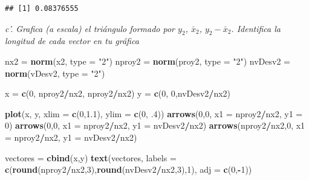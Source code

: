 \documentclass[
]{article}
\newenvironment{Shaded}{\begin{snugshade}}{\end{snugshade}}
\newcommand{\DataTypeTok}[1]{\textcolor[rgb]{0.13,0.29,0.53}{#1}}
\newcommand{\DecValTok}[1]{\textcolor[rgb]{0.00,0.00,0.81}{#1}}
\newcommand{\FloatTok}[1]{\textcolor[rgb]{0.00,0.00,0.81}{#1}}
\newcommand{\KeywordTok}[1]{\textcolor[rgb]{0.13,0.29,0.53}{\textbf{#1}}}
\newcommand{\NormalTok}[1]{#1}
\newcommand{\OperatorTok}[1]{\textcolor[rgb]{0.81,0.36,0.00}{\textbf{#1}}}
\newcommand{\StringTok}[1]{\textcolor[rgb]{0.31,0.60,0.02}{#1}}
\begin{document}
\begin{verbatim}
## [1] 0.08376555
\end{verbatim}

\emph{c'. Grafica (a escala) el triángulo formado por \(y_2\),
\(\bar{x}_2\), \(y_2-\bar{x}_2\). Identifica la longitud de cada vector
en tu gráfica}

\begin{Shaded}
\begin{Highlighting}[]
\NormalTok{  nx2 =}\StringTok{ }\KeywordTok{norm}\NormalTok{(x2, }\DataTypeTok{type =} \StringTok{"2"}\NormalTok{)}
\NormalTok{  nproy2 =}\StringTok{ }\KeywordTok{norm}\NormalTok{(proy2, }\DataTypeTok{type =} \StringTok{"2"}\NormalTok{)}
\NormalTok{  nvDesv2 =}\StringTok{ }\KeywordTok{norm}\NormalTok{(vDesv2, }\DataTypeTok{type =} \StringTok{"2"}\NormalTok{)}

  
\NormalTok{  x =}\StringTok{ }\KeywordTok{c}\NormalTok{(}\DecValTok{0}\NormalTok{, nproy2}\OperatorTok{/}\NormalTok{nx2, nproy2}\OperatorTok{/}\NormalTok{nx2)}
\NormalTok{  y =}\StringTok{ }\KeywordTok{c}\NormalTok{(}\DecValTok{0}\NormalTok{, }\DecValTok{0}\NormalTok{,nvDesv2}\OperatorTok{/}\NormalTok{nx2)}
  
  \KeywordTok{plot}\NormalTok{(x, y, }\DataTypeTok{xlim =} \KeywordTok{c}\NormalTok{(}\DecValTok{0}\NormalTok{,}\FloatTok{1.1}\NormalTok{), }\DataTypeTok{ylim =} \KeywordTok{c}\NormalTok{(}\DecValTok{0}\NormalTok{, }\FloatTok{.4}\NormalTok{))}
  \KeywordTok{arrows}\NormalTok{(}\DecValTok{0}\NormalTok{,}\DecValTok{0}\NormalTok{, }\DataTypeTok{x1 =}\NormalTok{ nproy2}\OperatorTok{/}\NormalTok{nx2, }\DataTypeTok{y1 =} \DecValTok{0}\NormalTok{)}
  \KeywordTok{arrows}\NormalTok{(}\DecValTok{0}\NormalTok{,}\DecValTok{0}\NormalTok{, }\DataTypeTok{x1 =}\NormalTok{ nproy2}\OperatorTok{/}\NormalTok{nx2, }\DataTypeTok{y1 =}\NormalTok{ nvDesv2}\OperatorTok{/}\NormalTok{nx2)}
  \KeywordTok{arrows}\NormalTok{(nproy2}\OperatorTok{/}\NormalTok{nx2,}\DecValTok{0}\NormalTok{, }\DataTypeTok{x1 =}\NormalTok{ nproy2}\OperatorTok{/}\NormalTok{nx2, }\DataTypeTok{y1 =}\NormalTok{ nvDesv2}\OperatorTok{/}\NormalTok{nx2)}
  
\NormalTok{  vectores =}\StringTok{ }\KeywordTok{cbind}\NormalTok{(x,y)}
  \KeywordTok{text}\NormalTok{(vectores, }\DataTypeTok{labels =} \KeywordTok{c}\NormalTok{(}\KeywordTok{round}\NormalTok{(nproy2}\OperatorTok{/}\NormalTok{nx2,}\DecValTok{3}\NormalTok{),}\KeywordTok{round}\NormalTok{(nvDesv2}\OperatorTok{/}\NormalTok{nx2,}\DecValTok{3}\NormalTok{),}\DecValTok{1}\NormalTok{), }\DataTypeTok{adj =} \KeywordTok{c}\NormalTok{(}\DecValTok{0}\NormalTok{,}\OperatorTok{-}\DecValTok{1}\NormalTok{))}
\end{Highlighting}
\end{Shaded}
\end{document}
